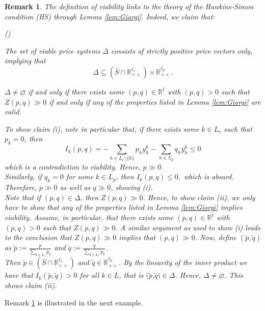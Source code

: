 \documentclass[11pt,fleqn]{article}
\newcounter{llist}
\newenvironment{numm}{\begin{list}{\rm (\roman{llist})}{\usecounter{llist}
	\setlength{\itemindent}{0em} \setlength{\leftmargin}{3.5em}
	\setlength{\labelwidth}{2.5em} \setlength{\labelsep}{1em}}}{\end{list}}
\newtheorem{remark}[theorem]{Remark}
\begin{document}
\begin{remark} \label{remark:Viable}
	The definition of viability links to the theory of the Hawkins-Simon condition (HS) through Lemma \ref{lem:Giorgi}. Indeed, we claim that:
	\begin{numm}
		\item The set of viable price systems $\Delta$ consists of strictly positive price vectors only, implying that
		\[
		\Delta \subseteq \left( \bar S \cap \mathbb R^{\ell_c}_{++} \right) \times \mathbb R^{\ell_p}_{++} .
		\]
		\item $\Delta \neq \varnothing$ if and only if there exists some $(p,q) \in \mathbb R^\ell$ with $(p,q) >0$ such that $Z (p,q) \gg 0$ if and only if any of the properties listed in Lemma \ref{lem:Giorgi} are valid.
	\end{numm}
	To show claim (i), note in particular that, if there exists some $k\in L_c$ such that $p_k=0$, then
	\[
	I_k(p,q)=-\sum_{h\in L_c \setminus \{ k \}}p_h y_h^k - \sum_{h \in L_p} q_h y^k_h \leqslant 0
	\]
	which is a contradiction to viability. Hence, $p\gg 0$. \\ Similarly, if $q_k= 0$ for some $k \in L_p$, then  $I_k(p,q) \leqslant 0,$ which is absurd. Therefore, $p \gg 0$ as well as $q \gg 0$, showing (i). \\[1ex]
	Note that if $(p,q)\in \Delta$, then $Z  (p,q)\gg0$. Hence, to show claim (ii), we only have to show that any of the properties listed in Lemma \ref{lem:Giorgi}  implies viability. Assume, in particular, that there exists some $(p,q) \in \mathbb R^\ell$ with $(p,q) >0$ such that $Z (p,q) \gg 0$. A similar argument as used to show (i) leads to the conclusion that $Z (p,q) \gg 0$ implies that $(p,q) \gg 0$. Now, define $(\tilde{p},\tilde{q})$ as $\tilde{p}:=\tfrac{p}{\sum_{k\in L_c}p_k} $ and $\tilde{q}:=\tfrac{q}{\sum_{k\in L_c}p_k} $.
	\\
	Then $\tilde{p}\in \left( \bar{S} \cap \mathbb R^{\ell_c}_{++} \right)$ and $\tilde{q}\in \mathbb{R}_{++}^{\ell_p}$.  By the linearity of the inner product we have that $I_k(\tilde{p},\tilde{q})>0$ for all $k \in L$, that is $(\tilde{p}$,$\tilde{q})\in \Delta$. Hence, $\Delta \neq \varnothing$. This shows claim (ii).
\end{remark}

\noindent
Remark \ref{remark:Viable} is illustrated in the next example.
\end{document}
